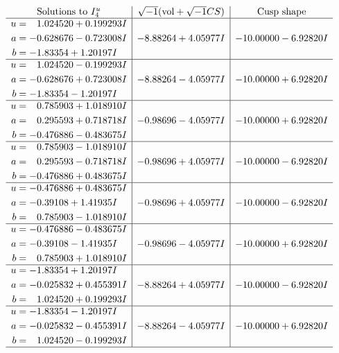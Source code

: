 \documentclass[1p]{elsarticle_modified}
\theoremstyle{definition}
\newcommand{\I}{\sqrt{-1}}
\begin{document}
$$\begin{array}{c|c|c}  
\text{Solutions to }I^u_{4}& \I (\text{vol} + \sqrt{-1}CS) & \text{Cusp shape}\\
 \hline 
\begin{aligned}
u &= \phantom{-}1.024520 + 0.199293 I \\
a &= -0.628676 - 0.723008 I \\
b &= -1.83354 + 1.20197 I\end{aligned}
 & -8.88264 + 4.05977 I & -10.00000 - 6.92820 I \\ \hline\begin{aligned}
u &= \phantom{-}1.024520 - 0.199293 I \\
a &= -0.628676 + 0.723008 I \\
b &= -1.83354 - 1.20197 I\end{aligned}
 & -8.88264 - 4.05977 I & -10.00000 + 6.92820 I \\ \hline\begin{aligned}
u &= \phantom{-}0.785903 + 1.018910 I \\
a &= \phantom{-}0.295593 + 0.718718 I \\
b &= -0.476886 - 0.483675 I\end{aligned}
 & -0.98696 - 4.05977 I & -10.00000 + 6.92820 I \\ \hline\begin{aligned}
u &= \phantom{-}0.785903 - 1.018910 I \\
a &= \phantom{-}0.295593 - 0.718718 I \\
b &= -0.476886 + 0.483675 I\end{aligned}
 & -0.98696 + 4.05977 I & -10.00000 - 6.92820 I \\ \hline\begin{aligned}
u &= -0.476886 + 0.483675 I \\
a &= -0.39108 + 1.41935 I \\
b &= \phantom{-}0.785903 - 1.018910 I\end{aligned}
 & -0.98696 + 4.05977 I & -10.00000 - 6.92820 I \\ \hline\begin{aligned}
u &= -0.476886 - 0.483675 I \\
a &= -0.39108 - 1.41935 I \\
b &= \phantom{-}0.785903 + 1.018910 I\end{aligned}
 & -0.98696 - 4.05977 I & -10.00000 + 6.92820 I \\ \hline\begin{aligned}
u &= -1.83354 + 1.20197 I \\
a &= -0.025832 + 0.455391 I \\
b &= \phantom{-}1.024520 + 0.199293 I\end{aligned}
 & -8.88264 + 4.05977 I & -10.00000 - 6.92820 I \\ \hline\begin{aligned}
u &= -1.83354 - 1.20197 I \\
a &= -0.025832 - 0.455391 I \\
b &= \phantom{-}1.024520 - 0.199293 I\end{aligned}
 & -8.88264 - 4.05977 I & -10.00000 + 6.92820 I\\
 \hline 
 \end{array}$$\newpage\newpage\renewcommand{\arraystretch}{1}
\end{document}

